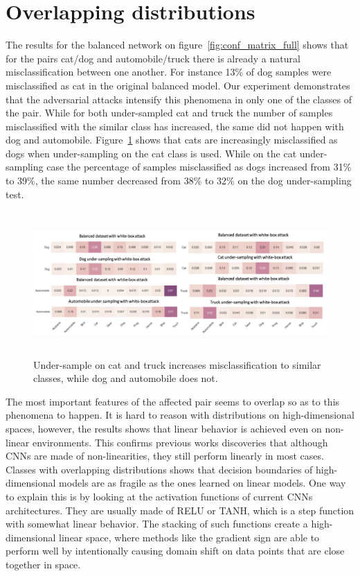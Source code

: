 \section{Overlapping distributions}
The results for the balanced network on figure~\ref{fig:conf_matrix_full} shows that for the pairs cat/dog and automobile/truck there is already a natural misclassification between one another. For instance 13\% of dog samples were misclassified as cat in the original balanced model. Our experiment demonstrates that the adversarial attacks intensify this phenomena in only one of the classes of the pair. While for both under-sampled cat and truck the number of samples misclassified with the similar class has increased, the same did not happen with dog and automobile. Figure~\ref{fig:overlap} shows that cats are increasingly misclassified as dogs when under-sampling on the cat class is used. While on the cat under-sampling case the percentage of samples misclassified as dogs increased from 31\% to 39\%, the same number decreased from 38\% to 32\% on the dog under-sampling test.

\begin{figure}
	\centering
	\includegraphics[height=5.5cm]{overlapping_all.png}
	\caption{Under-sample on cat and truck increases misclassification to similar classes, while dog and automobile does not.}
	\label{fig:overlap}
\end{figure}

The most important features of the affected pair seems to overlap so as to this phenomena to happen. It is hard to reason with distributions on high-dimensional spaces, however, the results shows that linear behavior is achieved even on non-linear environments. This confirms previous works discoveries that although CNNs are made of non-linearities, they still perform linearly in most cases. Classes with overlapping distributions shows that decision boundaries of high-dimensional models are as fragile as the ones learned on linear models. One way to explain this is by looking at the activation functions of current CNNs architectures. They are usually made of RELU or TANH, which is a step function with somewhat linear behavior. The stacking of such functions create a high-dimensional linear space, where methods like the gradient sign are able to perform well by intentionally causing domain shift on data points that are close together in space.
